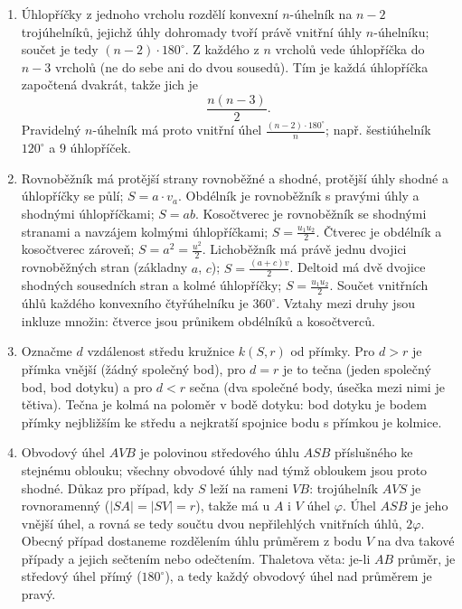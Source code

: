 \begin{enumerate}[label=\textbf{\arabic*.}, leftmargin=*, itemsep=0.8em]
  \item {}
  Úhlopříčky z jednoho vrcholu rozdělí konvexní $n$-úhelník na $n - 2$ trojúhelníků, jejichž úhly dohromady tvoří právě vnitřní úhly $n$-úhelníku; součet je tedy $(n - 2)\cdot 180^\circ$. Z každého z $n$ vrcholů vede úhlopříčka do $n - 3$ vrcholů (ne do sebe ani do dvou sousedů). Tím je každá úhlopříčka započtená dvakrát, takže jich je
  \begin{equation*}
    \frac{n(n - 3)}{2}.
  \end{equation*}
  Pravidelný $n$-úhelník má proto vnitřní úhel $\frac{(n - 2)\cdot 180^\circ}{n}$; např. šestiúhelník $120^\circ$ a $9$ úhlopříček. 

  \item {}
  Rovnoběžník má protější strany rovnoběžné a shodné, protější úhly shodné a úhlopříčky se půlí; $S = a\cdot v_a$. Obdélník je rovnoběžník s pravými úhly a shodnými úhlopříčkami; $S = ab$. Kosočtverec je rovnoběžník se shodnými stranami a navzájem kolmými úhlopříčkami; $S = \frac{u_1u_2}{2}$. Čtverec je obdélník a kosočtverec zároveň; $S = a^2 = \frac{u^2}{2}$. Lichoběžník má právě jednu dvojici rovnoběžných stran (základny $a$, $c$); $S = \frac{(a + c)v}{2}$. Deltoid má dvě dvojice shodných sousedních stran a kolmé úhlopříčky; $S = \frac{u_1u_2}{2}$. Součet vnitřních úhlů každého konvexního čtyřúhelníku je $360^\circ$. Vztahy mezi druhy jsou inkluze množin: čtverce jsou průnikem obdélníků a kosočtverců. 

  \item {}
  Označme $d$ vzdálenost středu kružnice $k(S, r)$ od přímky. Pro $d > r$ je přímka vnější (žádný společný bod), pro $d = r$ je to tečna (jeden společný bod, bod dotyku) a pro $d < r$ sečna (dva společné body, úsečka mezi nimi je tětiva). Tečna je kolmá na poloměr v bodě dotyku: bod dotyku je bodem přímky nejbližším ke středu a nejkratší spojnice bodu s přímkou je kolmice. 

  \item {}
  Obvodový úhel $AVB$ je polovinou středového úhlu $ASB$ příslušného ke stejnému oblouku; všechny obvodové úhly nad týmž obloukem jsou proto shodné. Důkaz pro případ, kdy $S$ leží na rameni $VB$: trojúhelník $AVS$ je rovnoramenný ($|SA| = |SV| = r$), takže má u $A$ i $V$ úhel $\varphi$. Úhel $ASB$ je jeho vnější úhel, a rovná se tedy součtu dvou nepřilehlých vnitřních úhlů, $2\varphi$. Obecný případ dostaneme rozdělením úhlu průměrem z bodu $V$ na dva takové případy a jejich sečtením nebo odečtením. Thaletova věta: je-li $AB$ průměr, je středový úhel přímý ($180^\circ$), a tedy každý obvodový úhel nad průměrem je pravý. 


\end{enumerate}
